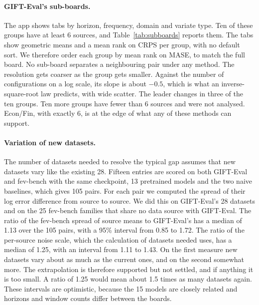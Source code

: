 \documentclass{article}
\begin{document}
\paragraph{GIFT-Eval's sub-boards.} The app shows tabs by horizon, frequency, domain and variate
type. Ten of these groups have at least 6 sources, and Table~\ref{tab:subboards} reports them.
The tabs show geometric means and a mean rank on CRPS per group, with no default sort. We
therefore order each group by mean rank on MASE, to match the full board. No sub-board
separates a neighbouring pair under any method. The resolution gets coarser as the group gets
smaller. Against the number of configurations on a log scale, its slope is about $-0.5$, which
is what an inverse-square-root law predicts, with wide scatter. The leader changes in three of
the ten groups. Ten more groups have fewer than 6 sources and were not analysed. Econ/Fin, with
exactly 6, is at the edge of what any of these methods can support.

\paragraph{Variation of new datasets.} The number of datasets needed to resolve the typical gap
assumes that new datasets vary like the existing 28. Fifteen entries are scored on both
GIFT-Eval and fev-bench with the same checkpoint, 13 pretrained models and the two naive
baselines, which gives 105 pairs. For each pair we computed the spread of their log error
difference from source to source. We did this on GIFT-Eval's 28 datasets and on the 25
fev-bench families that share no data source with GIFT-Eval. The ratio of the fev-bench spread
of source means to GIFT-Eval's has a median of 1.13 over the 105 pairs, with a 95\% interval
from 0.85 to 1.72. The ratio of the per-source noise scale, which the calculation of datasets
needed uses, has a median of 1.25, with an interval from 1.11 to 1.43. On the first measure new
datasets vary about as much as the current ones, and on the second somewhat more. The
extrapolation is therefore supported but not settled, and if anything it is too small. A ratio
of 1.25 would mean about 1.5 times as many datasets again. These intervals are optimistic,
because the 15 models are closely related and horizons and window counts differ between the
boards.
\end{document}
